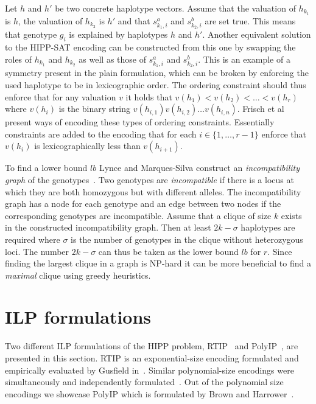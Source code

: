 \documentclass[12pt,a4paper]{article}
\begin{document}
Let $h$ and $h'$ be two concrete haplotype vectors.
Assume that the valuation of $h_{k_1}$ is $h$, the valuation of $h_{k_2}$ is $h'$ and that $s_{k_1, i}^a$ and  $s_{k_2, i}^b$ are set true.
This means that genotype $g_i$ is explained by haplotypes $h$ and $h'$.
Another equivalent solution to the HIPP-SAT encoding can be constructed from this one by swapping the roles of $h_{k_1}$ and $h_{k_2}$ as well as those of $s_{k_1, i}^a$ and  $s_{k_2, i}^b$.
This is an example of a symmetry present in the plain formulation, 
which can be broken by enforcing the used haplotype to be in lexicographic order.
The ordering constraint should thus enforce that for any valuation $v$ it holds that $v(h_1) < v(h_2) < \dots < v(h_r)$ where $v(h_i)$ is the binary string $v(h_{i,1})v(h_{i,2})\dots v(h_{i,n})$.
Frisch et al~\cite{DBLP:conf/cp/FrischHKMW02} present ways of encoding these types of ordering constraints.
Essentially constraints are added to the encoding that for each $i\in\{1,\dots ,r-1\}$ enforce that $v(h_i)$ is lexicographically less than $v(h_{i+1})$.

To find a lower bound $lb$ Lynce and Marques-Silva construct an \emph{incompatibility graph} of the genotypes~\cite{DBLP:conf/aaai/LynceM06}.
Two genotypes are \emph{incompatible} if there is a locus at which they are both homozygous but with different alleles.
The incompatibility graph has a node for each genotype and an edge between two nodes if the corresponding genotypes are incompatible.
Assume that a clique of size $k$ exists in the constructed incompatibility graph.
Then at least $2k - \sigma$ haplotypes are required where $\sigma$ is the number of genotypes in the clique without heterozygous loci.
The number $2k-\sigma$ can thus be taken as the lower bound $lb$ for $r$.
Since finding the largest clique in a graph is NP-hard it can be more beneficial to find a \emph{maximal} clique using greedy heuristics.


\section{ILP formulations}
\label{sec:ilp-hipp}
Two different ILP formulations of the HIPP problem, RTIP~\cite{DBLP:conf/cpm/Gusfield03} and PolyIP~\cite{DBLP:journals/tcbb/BrownH06}, are presented in this section.
RTIP is an exponential-size encoding formulated and empirically evaluated by Gusfield in~\cite{DBLP:conf/cpm/Gusfield03}.
Similar polynomial-size encodings were simultaneously and independently formulated~\cite{DBLP:journals/tcbb/BrownH06, DBLP:conf/recomb/HalldorssonBELYI02, DBLP:journals/informs/LanciaPR04}.
Out of the polynomial size encodings we showcase PolyIP which is formulated by Brown and Harrower~\cite{DBLP:journals/tcbb/BrownH06}.
\end{document}
